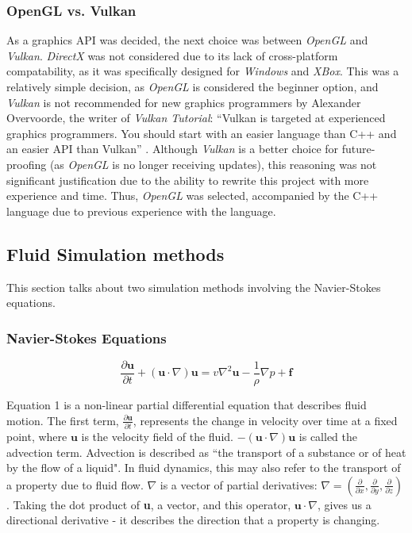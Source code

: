 \documentclass[12pt]{article}
\begin{document}
    \subsubsection{OpenGL vs. Vulkan}

    As a graphics API was decided, the next choice was between \textit{OpenGL} and \textit{Vulkan}. \textit{DirectX} was not considered due to its lack of cross-platform compatability, as it was specifically designed for \textit{Windows} and \textit{XBox}. This was a relatively simple decision, as \textit{OpenGL} is considered the beginner option, and \textit{Vulkan} is not recommended for new graphics programmers by Alexander Overvoorde, the writer of \textit{Vulkan Tutorial}: ``Vulkan is targeted at experienced graphics programmers. You should start with an easier language than C++ and an easier API than Vulkan'' \cite{vulkancomment}. Although \textit{Vulkan} is a better choice for future-proofing (as \textit{OpenGL} is no longer receiving updates), this reasoning was not significant justification due to the ability to rewrite this project with more experience and time. Thus, \textit{OpenGL} was selected, accompanied by the C++ language due to previous experience with the language.
    
    \subsection{Fluid Simulation methods}

    This section talks about two simulation methods involving the Navier-Stokes equations.

    \subsubsection{Navier-Stokes Equations}

    \begin{equation}
        \frac{\partial{\textbf{u}}}{\partial{t}} + (\textbf{u} \cdot\nabla)\textbf{u} = v\nabla^2 \textbf{u} - \frac{1}{\rho}\nabla p + \textbf{f}
    \end{equation}

    Equation 1 is a non-linear partial differential equation that describes fluid motion\cite{slides}. The first term, $\frac{\partial{\textbf{u}}}{\partial{t}}$, represents the change in velocity over time at a fixed point, where $\textbf{u}$ is the velocity field of the fluid. $-(\textbf{u}\cdot\nabla)\textbf{u}$ is called the advection term. Advection is described as ``the transport of a substance or of heat by the flow of a liquid"\cite{cambridge}. In fluid dynamics, this may also refer to the transport of a property due to fluid flow. $\nabla$ is a vector of partial derivatives: $\nabla = (\frac{\partial}{\partial x}, \frac{\partial}{\partial y}, \frac{\partial}{\partial z})$. Taking the dot product of \textbf{u}, a vector, and this operator, $\textbf{u}\cdot\nabla$, gives us a directional derivative - it describes the direction that a property is changing.
\end{document}
